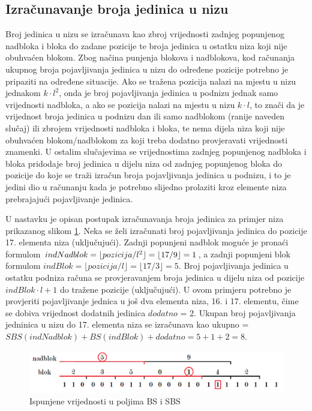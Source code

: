 \subsection{Izračunavanje broja jedinica u nizu}
Broj jedinica u nizu se izračunava kao zbroj vrijednosti zadnjeg popunjenog nadbloka i bloka do zadane pozicije te broja jedinica u ostatku niza koji nije obuhvaćen blokom. Zbog načina punjenja blokova i nadblokova, kod računanja ukupnog broja pojavljivanja jedinica u nizu do određene pozicije potrebno je pripaziti na određene situacije. Ako se tražena pozicija nalazi na mjestu u nizu jednakom $k\cdot l^2$, onda je broj pojavljivanja jedinica u podnizu jednak samo vrijednosti nadbloka, a ako se pozicija nalazi na mjestu u nizu $k\cdot l$, to znači da je vrijednost broja jedinica u podnizu dan ili samo nadblokom (ranije naveden slučaj) ili zbrojem vrijednosti nadbloka i bloka, te nema dijela niza koji nije obuhvaćen blokom/nadblokom za koji treba dodatno provjeravati vrijednosti znamenki. U ostalim slučajevima se vrijednostima zadnjeg popunjenog nadbloka i bloka pridodaje broj jedinica u dijelu niza od zadnjeg popunjenog bloka do pozicije do koje se traži izračun broja pojavljivanja jedinica u podnizu, i to je jedini dio u računanju kada je potrebno slijedno prolaziti kroz elemente niza prebrajajući pojavljivanje jedinica.

U nastavku je opisan postupak izračunavanja broja jedinica za primjer niza prikazanog slikom \ref{rrr2}. Neka se želi izračunati broj pojavljivanja jedinica do pozicije 17. elementa niza (uključujući). Zadnji popunjeni nadblok moguće je pronaći formulom $indNadblok = \linebreak \lfloor pozicija/l^2 \rfloor = \lfloor 17/9 \rfloor = 1$, a zadnji popunjeni blok formulom $indBlok = \lfloor pozicija/l \rfloor = \lfloor 17/3 \rfloor = 5$. Broj pojavljivanja jedinica u ostatku podniza računa se provjeravanjem broja jedinica u dijelu niza od pozicije $indBlok\cdot l+1$ do tražene pozicije (uključujući). U ovom primjeru potrebno je provjeriti pojavljivanje jednica u još dva elementa niza, 16. i 17. elementu, čime se dobiva vrijednost dodatnih jedinica $dodatno$ = 2. Ukupan broj pojavljivanja jedninica u nizu do 17. elementa niza se izračunava kao ukupno  = $SBS(indNadblok) + BS(indBlok) + dodatno = 5 + 1 + 2 = 8$.

\begin{figure}[H]
\centering
\includegraphics[width=\linewidth]{./pictures/rrr2.png}
\caption{Ispunjene vrijednosti u poljima BS i SBS}\label{rrr2}
\end{figure}
























